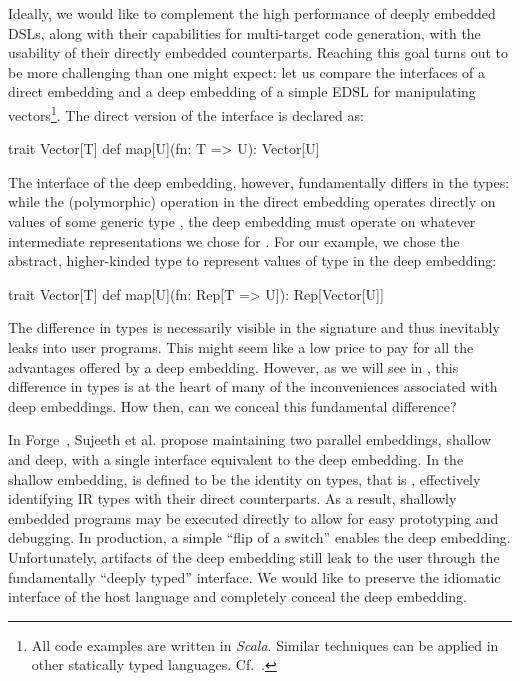 Ideally, we would like to complement the high performance of deeply
embedded DSLs, along with their capabilities for multi-target code
generation, with the usability of their directly embedded counterparts.
Reaching this goal turns out to
be more challenging than one might expect: let us compare the
interfaces of a direct embedding and a deep embedding of a simple
EDSL for manipulating vectors\footnote{
  All code examples are written in \emph{Scala}.  Similar techniques can
  be applied in other statically typed languages.  Cf.~\cite{carette_finally_2009,awesome,svenningsson_combining_2012}.}.
The direct version of the interface is declared as: \vspace{3pt}
\begin{listingtiny}
trait Vector[T] {
  def map[U](fn: T => U): Vector[U]
}
\end{listingtiny}
\vspace{3pt} The interface of the deep embedding, however,
fundamentally differs in the types: while the (polymorphic) 
operation in the direct embedding operates directly on values of some
generic type , the deep embedding must operate on whatever
intermediate representations we chose for . For our example,
we chose the abstract, higher-kinded type  to represent
values of type  in the deep embedding: \vspace{3pt}
\begin{listingtiny}
trait Vector[T] {
  def map[U](fn: Rep[T => U]): Rep[Vector[U]]
}
\end{listingtiny}

\vspace{3pt} The difference in types is necessarily visible in the
signature and thus inevitably leaks into user programs.  This might seem like
a low price to pay for all the advantages offered by a deep embedding.
However, as we will see in , this
difference in types is at the heart of many of the inconveniences
associated with deep embeddings. How then, can we conceal
this fundamental difference?

In Forge~\cite{forge}, Sujeeth et al. propose maintaining two parallel
embeddings, shallow and deep, with a single interface equivalent to
the deep embedding.  In the shallow embedding,  is defined
to be the identity on types, that is , effectively
identifying IR types with their direct counterparts.  As a result,
shallowly embedded programs may be executed directly to allow for easy
prototyping and debugging.  In production, a simple ``flip of a switch''
enables the deep embedding.  Unfortunately, artifacts of the deep
embedding still leak to the user through the fundamentally ``deeply
typed'' interface. We would like to preserve the idiomatic interface
of the host language and completely conceal the deep embedding.

